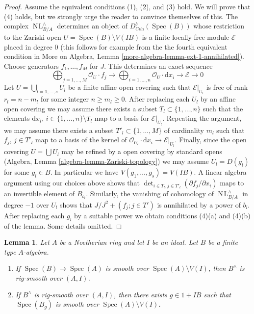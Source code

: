 \documentclass{stacks-project}
\theoremstyle{plain}
\newtheorem{lemma}[subsection]{Lemma}
\theoremstyle{definition}
\theoremstyle{remark}
\numberwithin{equation}{subsection}
\def\Spec{\mathop{\mathrm{Spec}}}
\def\NL{\mathop{N\!L}\nolimits}
\begin{document}
\begin{proof}
\medskip\noindent
Assume the equivalent conditions (1), (2), and (3) hold. We will prove
that (4) holds, but we strongly urge the reader to convince themselves
of this. The complex $\NL_{B/A}^\wedge$ determines an object of
$D^b_{\textit{Coh}}(\Spec(B))$ whose restriction to the Zariski open
$U = \Spec(B) \setminus V(IB)$ is a finite locally free module
$\mathcal{E}$ placed in degree $0$ (this follows for example from the
the fourth equivalent condition in
More on Algebra, Lemma \ref{more-algebra-lemma-ext-1-annihilated}).
Choose generators $f_1, \ldots, f_M$ for $J$.
This determines an exact sequence
$$
\bigoplus\nolimits_{j = 1, \ldots, M} \mathcal{O}_U \cdot f_j \to
\bigoplus\nolimits_{i = 1, \ldots, n} \mathcal{O}_U \cdot \text{d}x_i \to
\mathcal{E} \to 0
$$
Let $U = \bigcup_{l = 1, \ldots, s} U_l$
be a finite affine open covering such that
$\mathcal{E}|_{U_l}$ is free of rank $r_l = n - m_l$ for some integer
$n \geq m_l \geq 0$. After replacing
each $U_l$ by an affine open covering we may assume there exists
a subset $T_l \subset \{1, \ldots, n\}$ such that the elements
$\text{d}x_i$, $i \in \{1, \ldots, n\} \setminus T_l$ map to a
basis for $\mathcal{E}|_{U_l}$. Repeating the argument, we may
assume there exists a subset $T'_l \subset \{1, \ldots, M\}$
of cardinality $m_l$ such that $f_j$, $j \in T'_l$ map to a basis
of the kernel of $\mathcal{O}_{U_l} \cdot \text{d}x_i \to
\mathcal{E}|_{U_l}$. Finally, since the open covering
$U = \bigcup U_l$ may be refined by a open covering by standard opens
(Algebra, Lemma \ref{algebra-lemma-Zariski-topology})
we may assume $U_l = D(g_l)$ for some $g_l \in B$.
In particular we have $V(g_1, \ldots, g_s) = V(IB)$.
A linear algebra argument using our choices above shows that
$\det_{i \in T_l, j \in T'_l}(\partial f_j/ \partial x_i)$
maps to an invertible element of $B_{b_l}$. Similarly, the vanishing
of cohomology of $\NL_{B/A}^\wedge$ in degree $-1$ over $U_l$ shows that
$J/J^2 + (f_j; j \in T')$ is annihilated by a power of $b_l$.
After replacing each $g_l$ by a suitable power we obtain
conditions (4)(a) and (4)(b) of the lemma. Some details omitted.
\end{proof}

\begin{lemma}
\label{lemma-rig-smooth}
Let $A$ be a Noetherian ring and let $I$ be an ideal.
Let $B$ be a finite type $A$-algebra.
\begin{enumerate}
\item If $\Spec(B) \to \Spec(A)$ is smooth over $\Spec(A) \setminus V(I)$,
then $B^\wedge$ is rig-smooth over $(A, I)$.
\item If $B^\wedge$ is rig-smooth over $(A, I)$,
then there exists $g \in 1 + IB$ such that $\Spec(B_g)$ is smooth
over $\Spec(A) \setminus V(I)$.
\end{enumerate}
\end{lemma}
\end{document}
